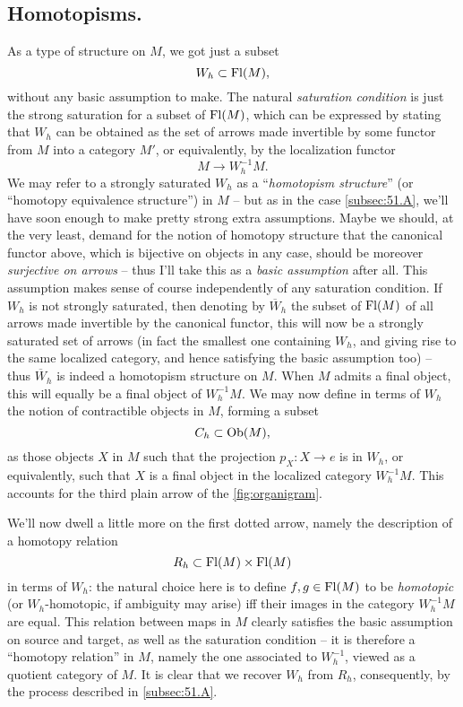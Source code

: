 \subsection[Homotopisms, and homotopism structures]{Homotopisms.}
\label{subsec:51.B}
As a type of structure on $M$, we got just a subset
\[W_h\subset\operatorname{Fl}(M),\]
without any basic assumption to make. The natural \emph{saturation
  condition} is just the strong saturation for a subset of $\operatorname{Fl}(M)$,
which can be expressed by stating that $W_h$ can be obtained as the
set of arrows made invertible by some functor from $M$ into a category
$M'$, or equivalently, by the localization functor
\[M\to W_h^{-1}M.\]
We may refer to a strongly saturated $W_h$ as a ``\emph{homotopism
  structure}'' (or ``homotopy equivalence structure'') in $M$ -- but
as in the case \ref{subsec:51.A}, we'll have soon enough to make
pretty strong extra assumptions. Maybe we should, at the very least,
demand for the notion of homotopy structure that the canonical functor
above, which is bijective on objects in any case, should be moreover
\emph{surjective on arrows} -- thus I'll take this as a
\emph{basic assumption} after all. This assumption makes sense of
course independently of any saturation condition. If $W_h$ is not
strongly saturated, then denoting by $\overline W_h$ the subset of $\operatorname{Fl}(M)$
of all arrows made invertible by the canonical functor, this will now
be a strongly saturated set of arrows (in fact the smallest one
containing $W_h$, and giving rise to the same localized category, and
hence satisfying the basic assumption too) -- thus $\overline W_h$ is
indeed a homotopism structure on $M$. When $M$ admits a final object,
this will equally be a final object of $W_h^{-1}M$. We may now define
in terms of $W_h$ the notion of contractible objects in $M$, forming a
subset
\[C_h \subset \operatorname{Ob}(M),\]
as those objects $X$ in $M$ such that the projection $p_X:X\to e$ is
in $W_h$, or equivalently, such that $X$ is a final object in the
localized category $W_h^{-1}M$. This accounts for the third plain
arrow of the \ref{fig:organigram}.

We'll now dwell a little more on the first dotted arrow, namely the
description of a homotopy relation
\[R_h \subset \operatorname{Fl}(M)\times\operatorname{Fl}(M)\]
in terms of $W_h$: the natural choice here is to define $f,g\in\operatorname{Fl}(M)$
to be \emph{homotopic} (or $W_h$-homotopic, if ambiguity may arise)
if{f} their images in the category $W_h^{-1}M$ are equal. This
relation between maps in $M$ clearly satisfies the basic assumption on
source and target, as well as the saturation condition -- it is
therefore a ``homotopy relation'' in $M$, namely the one associated to
$W_h^{-1}$, viewed as a quotient category of $M$. It is clear that we
recover $W_h$ from $R_h$, consequently, by the process described in
\ref{subsec:51.A}.


